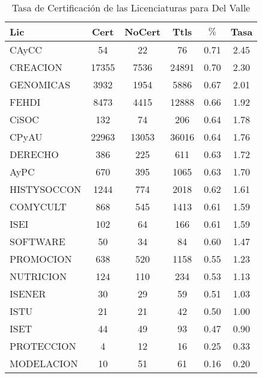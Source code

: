 \documentclass{article}
\begin{document}
\begin{table}[h]
\centering
\begin{tabular}{|l|cc|c|cc|}\hline\hline
Lic & Cert & NoCert & Ttls & $\%$ & Tasa \\\hline\hline
CAyCC & 54 & 22 & 76 & 0.71 & 2.45 \\
CREACION & 17355 & 7536 & 24891 & 0.70 & 2.30 \\
GENOMICAS & 3932 & 1954 & 5886 & 0.67 & 2.01 \\\hline\hline
FEHDI & 8473 & 4415 & 12888 & 0.66 & 1.92 \\
CiSOC & 132 & 74 & 206 & 0.64 & 1.78 \\
CPyAU & 22963 & 13053 & 36016 & 0.64 & 1.76 \\
DERECHO & 386 & 225 & 611 & 0.63 & 1.72 \\
AyPC & 670 & 395 & 1065 & 0.63 & 1.70 \\
HISTYSOCCON & 1244 & 774 & 2018 & 0.62 & 1.61 \\
COMYCULT & 868 & 545 & 1413 & 0.61 & 1.59 \\
ISEI & 102 & 64 & 166 & 0.61 & 1.59 \\\hline\hline
SOFTWARE & 50 & 34 & 84 & 0.60 & 1.47 \\
PROMOCION & 638 & 520 & 1158 & 0.55 & 1.23 \\
NUTRICION & 124 & 110 & 234 & 0.53 & 1.13 \\
ISENER & 30 & 29 & 59 & 0.51 & 1.03 \\
ISTU & 21 & 21 & 42 & 0.50 & 1.00 \\\hline\hline
ISET & 44 & 49 & 93 & 0.47 & 0.90 \\
PROTECCION & 4 & 12 & 16 & 0.25 & 0.33 \\
MODELACION & 10 & 51 & 61 & 0.16 & 0.20 \\\hline\hline
\end{tabular}
\caption{Tasa de Certificación de las Licenciaturas para Del Valle}
\end{table}
\end{document}
